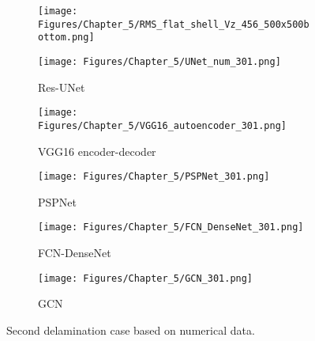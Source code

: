 
\begin{figure} [!h]
	\centering
	\begin{subfigure}[b]{.48\textwidth}
		\centering
		\texttt{[image: Figures/Chapter\_5/RMS\_flat\_shell\_Vz\_456\_500x500bottom.png]}
		\caption{}
		\label{fig:RMS_bottom_456}
	\end{subfigure}
	\hfill
	\begin{subfigure}[b]{.48\textwidth}
		\centering
		\texttt{[image: Figures/Chapter\_5/UNet\_num\_301.png]}
		\caption{Res-UNet}
		\label{fig:unet_301}	
	\end{subfigure}
	\hfill
	\begin{subfigure}[b]{.48\textwidth}
		\centering
		\texttt{[image: Figures/Chapter\_5/VGG16\_autoencoder\_301.png]}
		\caption{VGG16 encoder-decoder}
		\label{fig:vgg16_301}
	\end{subfigure}
	\hfill
	\begin{subfigure}[b]{.48\textwidth}
		\centering
		\texttt{[image: Figures/Chapter\_5/PSPNet\_301.png]}
		\caption{PSPNet}
		\label{fig:pspnet_301}	
	\end{subfigure}
	\hfill
	\begin{subfigure}[b]{.48\textwidth}
		\centering
		\texttt{[image: Figures/Chapter\_5/FCN\_DenseNet\_301.png]}
		\caption{FCN-DenseNet}
		\label{fig:densenet_301}
	\end{subfigure}
	\hfill
	\begin{subfigure}[b]{.48\textwidth}
		\centering
		\texttt{[image: Figures/Chapter\_5/GCN\_301.png]}
		\caption{GCN}
		\label{fig:gcn_301}	
	\end{subfigure}
	\caption{Second delamination case based on numerical data.}
	\label{fig:rms_second_case}
\end{figure}


